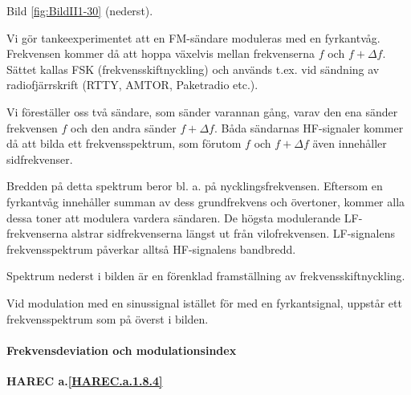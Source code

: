 Bild \ref{fig:BildII1-30} (nederst).

Vi gör tankeexperimentet att en FM-sändare moduleras med en fyrkantvåg.
Frekvensen kommer då att hoppa växelvis mellan frekvenserna \(f\) och
\(f + \Delta f\). Sättet kallas FSK (frekvensskiftnyckling) och används t.ex.
vid sändning av radiofjärrskrift (RTTY, AMTOR, Paketradio etc.).

Vi föreställer oss två sändare, som sänder varannan gång, varav den ena sänder
frekvensen \(f\) och den andra sänder \(f + \Delta f\). Båda sändarnas
HF-signaler kommer då att bilda ett frekvensspektrum, som förutom \(f\) och
\(f + \Delta f\) även innehåller sidfrekvenser.

Bredden på detta spektrum beror bl. a. på nycklingsfrekvensen. Eftersom en
fyrkantvåg innehåller summan av dess grundfrekvens och övertoner, kommer alla
dessa toner att modulera vardera sändaren. De högsta modulerande
LF-frekvenserna alstrar sidfrekvenserna längst ut från vilofrekvensen.
LF-signalens frekvensspektrum påverkar alltså HF-signalens bandbredd.

Spektrum nederst i bilden är en förenklad framställning av
frekvensskiftnyckling.

Vid modulation med en sinussignal istället för med en fyrkantsignal, uppstår ett
frekvensspektrum som på överst i bilden.

\paragraph{Frekvensdeviation och modulationsindex}
\textbf{HAREC a.\ref{HAREC.a.1.8.4}\label{myHAREC.a.1.8.4}}

